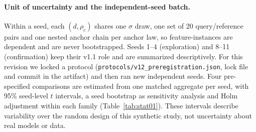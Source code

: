 %   

\paragraph{Unit of uncertainty and the independent-seed batch.}
Within a seed, each $(d,\rho_c)$ shares one $\sigma$ draw, one set of 20 query/reference pairs and one nested anchor chain per
anchor law, so feature-instances are dependent and are never bootstrapped. Seeds 1--4 (exploration) and 8--11
(confirmation) keep their v1.1 role and are summarized descriptively. For this revision we locked a protocol
(\texttt{protocols/v12\_preregistration.json}, lock file and commit in the artifact) and then ran
 new independent seeds. Four pre-specified comparisons are estimated from one matched aggregate
per seed, with 95\% seed-level $t$ intervals, a seed bootstrap as sensitivity analysis and Holm adjustment within each
family (Table~\ref{tab:stat01}). These intervals describe variability over the random design of this synthetic study,
not uncertainty about real models or data.

